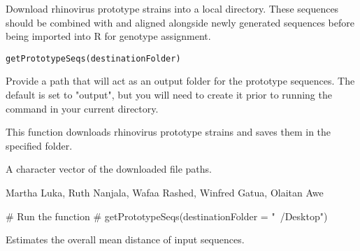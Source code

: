 \documentclass[a4paper]{book}
\begin{document}
%
\begin{Description}
Download rhinovirus prototype strains into a local directory. 
These sequences should be combined with and aligned alongside 
newly generated sequences before being imported into R for genotype assignment.
\end{Description}
%
\begin{Usage}
\begin{verbatim}
getPrototypeSeqs(destinationFolder)
\end{verbatim}
\end{Usage}
%
\begin{Arguments}
\begin{ldescription}
\item[\code{destinationFolder}] 
Provide a path that will act as an output folder for the prototype sequences. 
The default is set to "output", but you will need to create it 
prior to running the command in your current directory.

\end{ldescription}
\end{Arguments}
%
\begin{Details}
This function downloads rhinovirus prototype strains and saves them in the specified folder.
\end{Details}
%
\begin{Value}
A character vector of the downloaded file paths.
\end{Value}
%
\begin{Author}
Martha Luka, Ruth Nanjala, Wafaa Rashed, Winfred Gatua, Olaitan Awe 
\end{Author}
%
\begin{SeeAlso}
\end{SeeAlso}
%
\begin{Examples}
\begin{ExampleCode}
# Run the function
# getPrototypeSeqs(destinationFolder = "~/Desktop")
\end{ExampleCode}
\end{Examples}
%
\begin{Description}
Estimates the overall mean distance of input sequences.
\end{Description}
\end{document}
